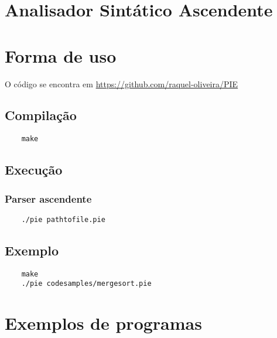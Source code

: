 \documentclass[12pt]{report}
\begin{document}
\newpage
\chapter{Analisador Sintático Ascendente}


\newpage
\chapter{Forma de uso}
O código se encontra em \url{https://github.com/raquel-oliveira/PIE}
\section{Compilação}
\begin{verbatim}
    make
\end{verbatim}

\section{Execução}
\subsection{Parser ascendente}
\begin{verbatim}
    ./pie pathtofile.pie
\end{verbatim}

\section{Exemplo}
\begin{verbatim}
    make
    ./pie codesamples/mergesort.pie
\end{verbatim}

\newpage
\chapter{Exemplos de programas}


\newpage
\end{document}
